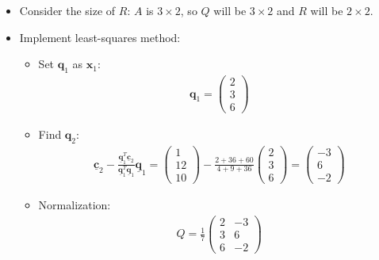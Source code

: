 \documentclass[10pt,a4paper]{article}
\begin{document}
\begin{itemize}
    \item Consider the size of $R$: $A$ is $3 \times 2$, so $Q$ will be $3 \times 2$ and $R$ will be $2 \times 2$.
    \item Implement least-squares method:
    \begin{itemize}
        \item Set $\textbf{q}_1$ as $\textbf{x}_1$:
        \begin{align*}
            \textbf{q}_1 = \begin{pmatrix}
                2\\3\\6
            \end{pmatrix}
        \end{align*}
        \item Find $\textbf{q}_2$:
        \begin{align*}
            \underline{\mathbf{c}}_{2}-\frac{\underline{\mathbf{q}}_{1}^{T} \underline{\mathbf{c}}_{2}}{\underline{\mathbf{q}}_{1}^{T} \underline{\mathbf{q}}_{1}} \underline{\mathbf{q}}_{1}=\left(\begin{array}{c}
                1 \\
                12 \\
                10
                \end{array}\right)-\frac{2+36+60}{4+9+36}\left(\begin{array}{c}
                2 \\
                3 \\
                6
                \end{array}\right)=\left(\begin{array}{c}
                -3 \\
                6 \\
                -2
                \end{array}\right)
        \end{align*}
        \item Normalization:
        \begin{align*}
            Q=\frac{1}{7}\left(\begin{array}{cc}
                2 & -3 \\
                3 & 6 \\
                6 & -2
                \end{array}\right)
        \end{align*}
    \end{itemize}

\end{itemize}
\end{document}
